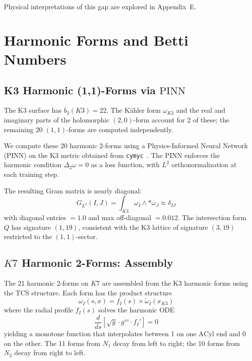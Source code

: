 \documentclass[11pt,a4paper]{article}
\newcommand{\Kseven}{K_7}
\newcommand{\ACyl}{\mathrm{ACyl}}
\newcommand{\PINN}{\mathrm{PINN}}
\theoremstyle{remark}
\def\Kseven{K7}%
\begin{document}
Physical interpretations of this gap are explored in Appendix~E.

\section{Harmonic Forms and Betti Numbers}

\subsection{K3 Harmonic (1,1)-Forms via $\PINN$}

The K3 surface has $b_2(K3) = 22$. The K\"ahler form $\omega_{K3}$ and the real and imaginary
parts of the holomorphic $(2,0)$-form account for 2 of these; the remaining 20
$(1,1)$-forms are computed independently.

We compute these 20 harmonic 2-forms using a Physics-Informed Neural Network ($\PINN$)
on the K3 metric obtained from \texttt{cymyc}~\cite{ref10}. The $\PINN$ enforces the harmonic condition
$\Delta_2 \omega = 0$ as a loss function, with $L^2$ orthonormalization at each training step.

The resulting Gram matrix is nearly diagonal:
\begin{equation}
G_{L^2}(I, J) = \int_{K3} \omega_I \wedge {*}\omega_J \approx \delta_{IJ}
\end{equation}
with diagonal entries $= 1.0$ and max off-diagonal $= 0.012$. The intersection form $Q$
has signature $(1, 19)$, consistent with the K3 lattice of signature $(3, 19)$ restricted
to the $(1,1)$-sector.

\subsection{$\Kseven$ Harmonic 2-Forms: Assembly}

The 21 harmonic 2-forms on $\Kseven$ are assembled from the K3 harmonic forms using the
TCS structure. Each form has the product structure
\begin{equation}
\omega_I(s, x) = f_I(s) \times \tilde{\omega}_I(x_{K3})
\end{equation}
where the radial profile $f_I(s)$ solves the harmonic ODE
\begin{equation}
\frac{d}{ds}\left[\sqrt{g} \cdot g^{ss} \cdot f_I'\right] = 0
\end{equation}
yielding a monotone function that interpolates between 1 on one $\ACyl$ end and 0 on
the other. The 11 forms from $N_1$ decay from left to right; the 10 forms from $N_2$
decay from right to left.
\end{document}
